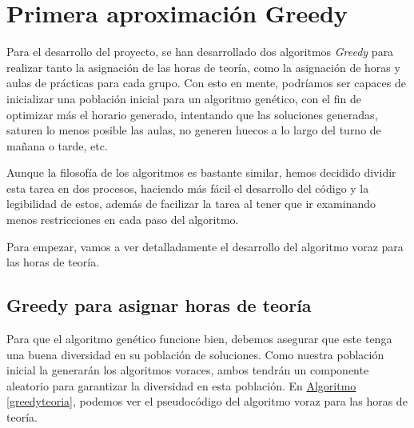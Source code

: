 \chapter{Primera aproximación Greedy}
Para el desarrollo del proyecto, se han desarrollado dos algoritmos \textit{Greedy} para realizar tanto la asignación de las horas de teoría, como la asignación de horas y aulas de prácticas para cada grupo. Con esto en mente, podríamos ser capaces de inicializar una población inicial para un algoritmo genético, con el fin de optimizar más el horario generado, intentando que las soluciones generadas, saturen lo menos posible las aulas, no generen huecos a lo largo del turno de mañana o tarde, etc.

Aunque la filosofía de los algoritmos es bastante similar, hemos decidido dividir esta tarea en dos procesos, haciendo más fácil el desarrollo del código y la legibilidad de estos, además de facilizar la tarea al tener que ir examinando menos restricciones en cada paso del algoritmo. 

Para empezar, vamos a ver detalladamente el desarrollo del algoritmo voraz para las horas de teoría.

\section{Greedy para asignar horas de teoría}

Para que el algoritmo genético funcione bien, debemos asegurar que este tenga una buena diversidad en su población de soluciones. Como nuestra población inicial la generarán los algoritmos voraces, ambos tendrán un componente aleatorio para garantizar la diversidad en esta población. En \hyperref[greedyteoria]{Algoritmo \ref*{greedyteoria}}, podemos ver el pseudocódigo del algoritmo voraz para las horas de teoría.


